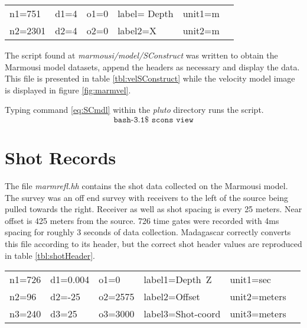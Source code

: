 {
\begin{tabular}{|llllll|}
        \hline        
    n1=751    &     d1=4   &        o1=0  &        label= Depth & unit1=m &  \\ 
    n2=2301   &     d2=4   &        o2=0  &        label2=X     & unit2=m &  \\
	\hline
\end{tabular}
}

The script found at \emph{marmousi/model/SConstruct} was written to obtain the Marmousi model datasets, append the headers as necessary and display the  data.  This file is presented in table \ref{tbl:velSConstruct} while the velocity model image is displayed in figure \ref{fig:marmvel}.
 
{
\tiny

\normalsize
}


Typing command \ref{eq:SCmdl} within the \emph{pluto} directory runs the script.
\begin{equation}\label{eq:SCmdl} \texttt{bash-3.1\$\ scons\ view} \end{equation}


\section{Shot Records}
The file \emph{marmrefl.hh} contains the shot data collected on the Marmousi model.  The survey was an off end survey with receivers to the left of the source being pulled towards the right.  Receiver as well as shot spacing is every 25 meters.  Near offset is 425 meters from the source.  726 time gates were recorded with 4ms spacing for roughly 3 seconds of data collection.  Madagascar correctly converts this file according to its header, but the correct shot header values are reproduced in table \ref{tbl:shotHeader}.   

{
	\begin{tabular}{|llllll|}
	\hline  
	    n1=726 &  d1=0.004 &  o1=0     &  label1=Depth\ Z   &   unit1=sec     & \\
    	    n2=96  &  d2=-25   &  o2=2575  &  label2=Offset     &   unit2=meters  & \\
            n3=240 &  d3=25    &  o3=3000  &  label3=Shot-coord &   unit3=meters  & \\
	\hline
	\end{tabular}
}

